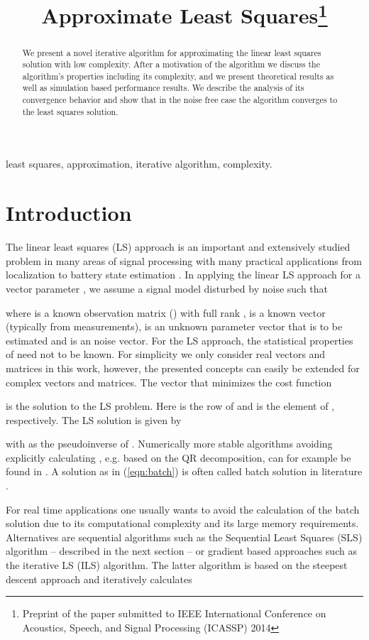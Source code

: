 \documentclass{article}
\title{Approximate Least Squares\footnote{Preprint of the paper submitted to IEEE International Conference on Acoustics, Speech, and Signal Processing (ICASSP) 2014}}
\begin{document}
\onecolumn
\maketitle
\sloppy
\begin{abstract}
We present a novel iterative algorithm for approximating the linear least squares 
solution with low complexity. 
After a motivation of the algorithm we discuss the algorithm's
properties including its complexity, and we present theoretical results as well as 
simulation based performance results.
We describe the analysis of its convergence behavior and show that in the noise free 
case the algorithm converges to the least squares solution.
\end{abstract}

\begin{keywords}
least squares, approximation, iterative algorithm, complexity.
\end{keywords}
\section{Introduction}
\label{sec:intro}
The linear least squares (LS) approach is an important and extensively
studied problem in many areas of signal processing with many 
practical applications from localization \cite{localization} 
to battery state estimation \cite{batterystate}. 
In applying the linear LS approach for a vector parameter ,
we assume a signal model  disturbed by noise  such 
that

where  is a known  observation matrix () with 
full rank ,  is a known  vector 
(typically from measurements),  is an unknown  parameter 
vector that is to be estimated and  is an  noise vector.
For the LS approach, the statistical properties of  need not to be known.
For simplicity we only consider real vectors and matrices in this work, 
however, the presented concepts can  
easily be extended for complex vectors and matrices. 
The vector  that minimizes the cost function

is the solution to the LS problem. Here 
 is the  row of  and 
 is the  element of , respectively. The LS 
solution is given by

with  as the pseudoinverse 
of . Numerically more stable algorithms avoiding explicitly calculating , e.g. based on 
the QR decomposition, can for example be found in \cite{numeric}. 
A solution as in (\ref{eqn:batch}) is often called batch solution in literature \cite{kay}.

For real time applications one usually wants to avoid the calculation of the batch solution due to 
its computational complexity and its large memory requirements. Alternatives are
sequential algorithms such as the Sequential Least Squares (SLS) algorithm 
-- described in the next section -- or
gradient based approaches such as the iterative LS (ILS) \cite{numeric} algorithm. 
The latter algorithm is based on the steepest descent approach and iteratively calculates
\end{document}
